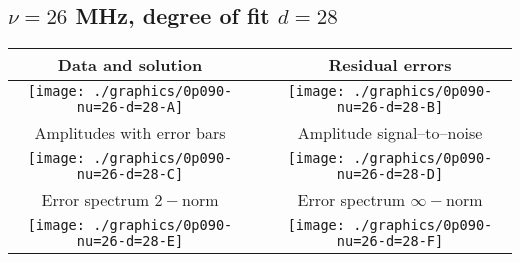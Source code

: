 

% 

\clearpage{}
\break{}

\subsection{$\nu = 26$ MHz, degree of fit $d = 28$}

\begin{table}[h]
    \begin{center}
        \begin{tabular}{ccc}
            Data and solution & \quad & Residual errors \\\hline
            \texttt{[image: ./graphics/0p090-nu=26-d=28-A]} &&
            \texttt{[image: ./graphics/0p090-nu=26-d=28-B]} \\[15pt]
            Amplitudes with error bars && Amplitude signal--to--noise \\\hline
            \texttt{[image: ./graphics/0p090-nu=26-d=28-C]} &&
            \texttt{[image: ./graphics/0p090-nu=26-d=28-D]} \\[15pt]
            Error spectrum $2-$norm && Error spectrum $\infty-$norm \\\hline
            \texttt{[image: ./graphics/0p090-nu=26-d=28-E]} &&
            \texttt{[image: ./graphics/0p090-nu=26-d=28-F]} \\[15pt]
        \end{tabular}
    \end{center}
\label{fig:elev=90, nu=26}
\end{table}



\endinput
